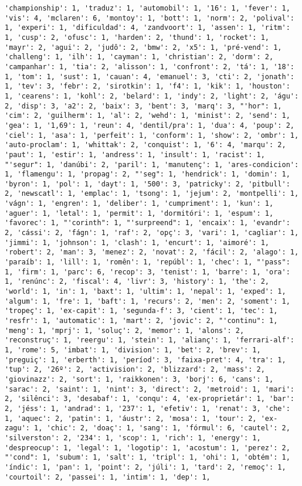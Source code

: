 \documentclass[11pt]{article}
\begin{document}
\begin{Verbatim}[commandchars=\\\{\}]
'championship': 1, 'traduz': 1, 'automobil': 1, '16': 1, 'fever': 1, 'vis': 4, 'mclaren': 6, 'montoy': 1, 'bott': 1, 'norm': 2, 'polival': 1, 'experi': 1, 'dificuldad': 4, 'zandvoort': 1, 'assen': 1, 'ritm': 1, 'cusp': 2, 'ofusc': 1, 'harden': 2, 'thund': 1, 'rocket': 1, 'mayr': 2, 'agui': 2, 'judô': 2, 'bmw': 2, 'x5': 1, 'pré-vend': 1, 'challeng': 1, 'ilh': 1, 'cayman': 1, 'christian': 2, 'dorm': 2, 'campanhar': 1, 'tia': 2, 'alisson': 1, 'confront': 2, 'tá': 1, '18': 1, 'tom': 1, 'sust': 1, 'cauan': 4, 'emanuel': 3, 'cti': 2, 'jonath': 1, 'tev': 3, 'febr': 2, 'sirotkin': 1, 'f4': 1, 'kik': 1, 'houston': 1, 'cearens': 1, 'kohl': 2, 'belard': 1, 'indy': 2, 'light': 2, 'águ': 2, 'disp': 3, 'a2': 2, 'baix': 3, 'bent': 3, 'marq': 3, "'hor": 1, 'cim': 2, 'guilherm': 1, 'al': 2, 'wehd': 1, 'minist': 2, 'send': 1, 'gea': 1, '1,69': 1, 'reun': 4, 'dentil/pra': 1, 'dua': 4, 'poup': 2, 'ciel': 1, 'asa': 1, 'perfeit': 1, 'conform': 1, 'show': 2, 'ombr': 1, 'auto-proclam': 1, 'whittak': 2, 'conquist': 1, '6': 4, 'marqu': 2, 'paut': 1, 'estir': 1, 'andress': 1, 'insult': 1, 'racist': 1, "'segur": 1, 'danúbi': 2, 'paril': 1, 'manutenç': 1, 'ares-condicion': 1, 'flamengu': 1, 'propag': 2, "'seg": 1, 'hendrick': 1, 'domin': 1, 'byron': 1, 'pol': 1, 'dayt': 1, '500': 3, 'patricky': 2, 'pitbull': 2, 'newscatl': 1, 'emplac': 1, 'tsong': 1, 'jejum': 2, 'montpelli': 1, 'vágn': 1, 'engren': 1, 'deliber': 1, 'cumpriment': 1, 'kun': 1, 'aguer': 1, 'letal': 1, 'permit': 1, 'dormitóri': 1, 'espum': 1, 'favorec': 1, "'corinth": 1, "'surpreend": 1, 'encaix': 1, 'evandr': 2, 'cássi': 2, 'fágn': 1, 'raf': 2, 'opç': 3, 'vari': 1, 'cagliar': 1, 'jimmi': 1, 'johnson': 1, 'clash': 1, 'encurt': 1, 'aimoré': 1, 'robert': 2, 'man': 3, 'menez': 2, 'novat': 2, 'fácil': 2, 'alago': 1, 'paraíb': 1, 'lill': 1, 'romên': 1, 'repúbl': 1, 'chec': 1, "'pass": 1, 'firm': 1, 'parc': 6, 'recop': 3, 'tenist': 1, 'barre': 1, 'ora': 1, 'renúnc': 2, 'fiscal': 4, 'livr': 3, 'history': 1, 'the': 2, 'world': 1, 'in': 1, 'baxt': 1, 'ultim': 1, 'nepal': 1, 'exped': 1, 'algum': 1, 'fre': 1, 'baft': 1, 'recurs': 2, 'men': 2, 'soment': 1, 'tropeç': 1, 'ex-capit': 1, 'segunda-f': 3, 'cient': 1, 'tec': 1, 'resfr': 1, 'automatic': 1, 'mart': 2, 'jovic': 2, "'continu": 1, 'meng': 1, 'mprj': 1, 'soluç': 2, 'memor': 1, 'alons': 2, 'reconstruç': 1, 'reergu': 1, 'stein': 1, 'alianç': 1, 'ferrari-alf': 1, 'rome': 5, 'imbat': 1, 'division': 1, 'bet': 2, 'brev': 1, 'preguiç': 1, 'erberth': 1, 'períod': 3, 'faixa-pret': 4, 'tra': 1, 'tup': 2, '26º': 2, 'activision': 2, 'blizzard': 2, 'mass': 2, 'giovinazz': 2, 'sort': 1, 'raikkonen': 3, 'borj': 6, 'cans': 1, 'sarac': 2, 'saint': 1, 'nint': 3, 'direct': 2, 'metroid': 1, 'mari': 2, 'silênci': 3, 'desabaf': 1, 'conqu': 4, 'ex-proprietár': 1, 'bar': 2, 'jéss': 1, 'andrad': 1, '237': 1, 'efetiv': 1, 'renat': 3, 'che': 1, 'aquec': 2, 'patin': 1, 'áustr': 2, 'mosa': 1, 'tour': 2, 'ex-zagu': 1, 'chic': 2, 'doaç': 1, 'sang': 1, 'fórmul': 6, 'cautel': 2, 'silverston': 2, '234': 1, 'scop': 1, 'rich': 1, 'energy': 1, 'despreocup': 1, 'legal': 1, 'logotip': 1, 'acostum': 1, 'perez': 2, "'cond": 1, 'subum': 1, 'salt': 1, 'tripl': 1, 'ohi': 1, 'obtém': 1, 'índic': 1, 'pan': 1, 'point': 2, 'júli': 1, 'tard': 2, 'remoç': 1, 'courtoil': 2, 'passei': 1, 'intim': 1, 'dep': 1, 
\end{Verbatim}
\end{document}
